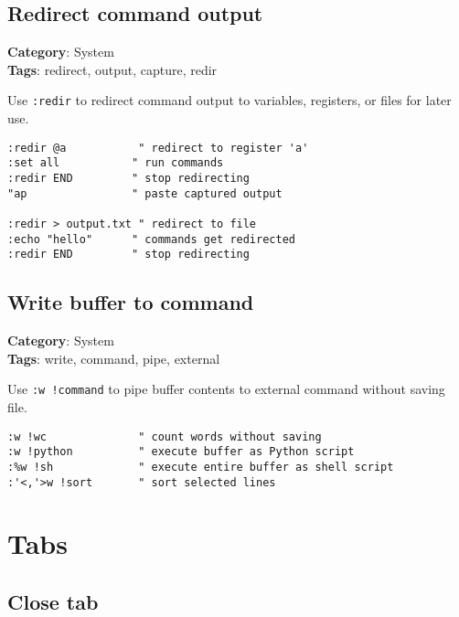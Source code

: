 {{{{{{{{{{{{{\section{Redirect command output}

\textbf{Category}: System\\ \textbf{Tags}: redirect, output, capture, redir
\vspace{0.5cm}

Use {\footnotesize \Verb§:redir§} to redirect command output to variables, registers, or files for later use.

\begin{Exa*}{}
\begin{Verbatim}[fontsize=\footnotesize, breaklines, breakanywhere]
:redir @a           " redirect to register 'a'
:set all           " run commands
:redir END         " stop redirecting
"ap                " paste captured output

:redir > output.txt " redirect to file
:echo "hello"      " commands get redirected
:redir END         " stop redirecting
\end{Verbatim}
\end{Exa*}

\section{Write buffer to command}

\textbf{Category}: System\\ \textbf{Tags}: write, command, pipe, external
\vspace{0.5cm}

Use {\footnotesize \Verb§:w !command§} to pipe buffer contents to external command without saving file.

\begin{Exa*}{}
\begin{Verbatim}[fontsize=\footnotesize, breaklines, breakanywhere]
:w !wc              " count words without saving
:w !python          " execute buffer as Python script
:%w !sh             " execute entire buffer as shell script
:'<,'>w !sort       " sort selected lines
\end{Verbatim}
\end{Exa*}

\chapter{Tabs}
\section{Close tab}

}}}}}}}}}}}}}
